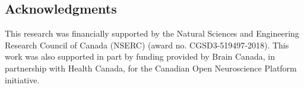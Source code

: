 \documentclass[10pt]{SelfArx} %
\begin{document}
\subsection*{Acknowledgments} 
This research was financially supported by the Natural Sciences and Engineering Research Council of Canada (NSERC)
(award no. CGSD3-519497-2018). This work was also supported in part by funding provided by Brain Canada, in partnership
with Health Canada, for the Canadian Open Neuroscience Platform initiative.



\end{document}
